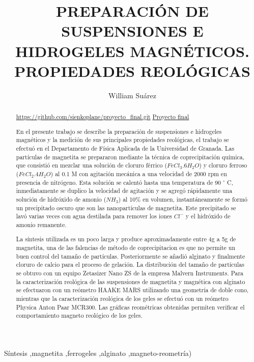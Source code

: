 \documentclass[review]{elsarticle}
\begin{document}
\begin{frontmatter}
\title{PREPARACI\'ON DE SUSPENSIONES E HIDROGELES MAGN\'ETICOS. PROPIEDADES REOL\'OGICAS}


\author[a]{William Su\'arez}
\address[a]{Afiliaci\'on X1.}



\begin{abstract}
\url{https://github.com/sienkoplane/proyecto_final.git}
\href{https://github.com/sienkoplane/proyecto_final.git}{Proyecto final}

En el presente trabajo se describe la preparaci\'on de suspensiones e hidrogeles magn\'eticos y la medici\'on de sus principales propiedades reol\'ogicas, el trabajo se efectu\'o en el Departamento de F\'isica Aplicada de la Universidad de Granada. Las part\'iculas de magnetita se prepararon mediante la t\'ecnica de coprecipitaci\'on qu\'imica, que consisti\'o en mezclar una soluci\'on de cloruro f\'errico ($Fe Cl_{3} .6 H_{2}O$) y cloruro ferroso ($Fe Cl_{2} .4 H_{2}O$) al 0.1 M con agitaci\'on mec\'anica a una velocidad de 2000 rpm en presencia de nitr\'ogeno. Esta soluci\'on se calent\'o hasta una temperatura de 90 {\ensuremath{{}^\circ}} C, inmediatamente se duplico la velocidad de agitaci\'on y se agreg\'o r\'apidamente una soluci\'on de hidr\'oxido de amonio ($NH_3$) al 10\% en volumen, instant\'aneamente se form\'o un precipitado oscuro que son las nanopart\'iculas de magnetita.
Este precipitado se lav\'o varias veces con agua destilada para remover los iones $C l^{ -}$ y el hidr\'oxido de amonio remanente.

La s\'intesis utilizada es un poco larga y produce aproximadamente entre 4g a 5g de magnetita, una de las falencias de m\'etodo de coprecipitacion es que no permite un buen control del tama\~no de part\'iculas. Posteriormente se a\~nadi\'o alginato y finalmente cloruro de calcio para el proceso de gelaci\'on. La distribuci\'on del tama\~no de part\'iculas se obtuvo con un equipo Zetasizer Nano ZS de la empresa Malvern Instruments. Para la caracterizaci\'on reol\'ogica de las suspensiones de magnetita y magn\'etica con alginato se efectuaron con un re\'ometro HAAKE MARS utilizando una geometr\'ia de doble cono, mientras que la caracterizaci\'on reol\'ogica de los geles se efectu\'o con un re\'ometro Physica Anton Paar MCR300. Las gr\'aficas reom\'etricas obtenidas permiten verificar
el comportamiento magneto reol\'ogico de los geles.

\end{abstract}

\begin{keyword}
S\'intesis \sep magnetita \sep ferrogeles \sep alginato \sep magneto-reometr\'ia)
\end{keyword}

\end{frontmatter}
\end{document}
